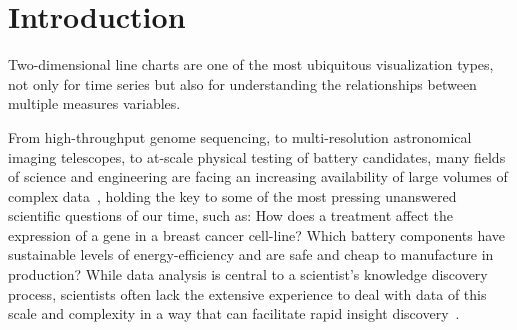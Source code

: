 \section{Introduction\label{sec:intro}}
Two-dimensional line charts are one of the most ubiquitous visualization types, not only for time series but also for understanding the relationships between multiple measures variables.  

From high-throughput genome sequencing,
to multi-resolution astronomical imaging telescopes,
to at-scale physical testing of battery candidates,
many fields of science and engineering
are facing an increasing availability of
large volumes of complex data~\cite{AustinNothaft2015,Demchenko2013},
holding the key to some of the most pressing
unanswered scientific questions of our time,
such as: How does a treatment affect the
expression of a gene in a breast cancer cell-line?
Which battery components have sustainable levels
of energy-efficiency and are safe and cheap to
manufacture in production?
While data analysis is central to a scientist's
knowledge discovery process, scientists
often lack the extensive experience to deal
with data of this scale and complexity
in a way that can facilitate rapid insight discovery~\cite{Kersten2011}.

